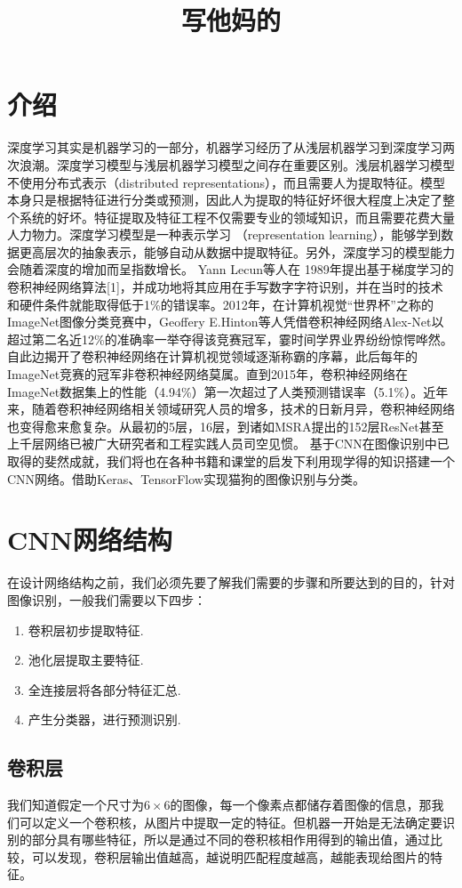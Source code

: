 \documentclass[lang=cn,11pt]{elegantpaper}
\title{写他妈的}
\date{}
\begin{document}
\newpage
\Large
\tableofcontents
\thispagestyle{empty}
\newpage
\normalsize
{}



\section{介绍}
深度学习其实是机器学习的一部分，机器学习经历了从浅层机器学习到深度学习两次浪潮。深度学习模型与浅层机器学习模型之间存在重要区别。浅层机器学习模型不使用分布式表示（distributed representations），而且需要人为提取特征。模型本身只是根据特征进行分类或预测，因此人为提取的特征好坏很大程度上决定了整个系统的好坏。特征提取及特征工程不仅需要专业的领域知识，而且需要花费大量人力物力。深度学习模型是一种表示学习 （representation learning），能够学到数据更高层次的抽象表示，能够自动从数据中提取特征。另外，深度学习的模型能力会随着深度的增加而呈指数增长。
Yann Lecun等人在 1989年提出基于梯度学习的卷积神经网络算法[1]，并成功地将其应用在手写数字字符识别，并在当时的技术和硬件条件就能取得低于1\%的错误率。2012年，在计算机视觉“世界杯”之称的ImageNet图像分类竞赛中，Geoffery E.Hinton等人凭借卷积神经网络Alex-Net以超过第二名近12\%的准确率一举夺得该竞赛冠军，霎时间学界业界纷纷惊愕哗然。自此边揭开了卷积神经网络在计算机视觉领域逐渐称霸的序幕，此后每年的ImageNet竞赛的冠军非卷积神经网络莫属。直到2015年，卷积神经网络在ImageNet数据集上的性能（4.94\%）第一次超过了人类预测错误率（5.1\%）。近年来，随着卷积神经网络相关领域研究人员的增多，技术的日新月异，卷积神经网络也变得愈来愈复杂。从最初的5层，16层，到诸如MSRA提出的152层ResNet甚至上千层网络已被广大研究者和工程实践人员司空见惯。
基于CNN在图像识别中已取得的斐然成就，我们将也在各种书籍和课堂的启发下利用现学得的知识搭建一个CNN网络。借助Keras、TensorFlow实现猫狗的图像识别与分类。


\section{CNN网络结构}
在设计网络结构之前，我们必须先要了解我们需要的步骤和所要达到的目的，针对图像识别，一般我们需要以下四步：

\begin{enumerate}
	\item 卷积层初步提取特征.
	\item 池化层提取主要特征.
	\item 全连接层将各部分特征汇总.
	\item 产生分类器，进行预测识别.
\end{enumerate}

\subsection{卷积层}
我们知道假定一个尺寸为$6\times 6$的图像，每一个像素点都储存着图像的信息，那我们可以定义一个卷积核，从图片中提取一定的特征。但机器一开始是无法确定要识别的部分具有哪些特征，所以是通过不同的卷积核相作用得到的输出值，通过比较，可以发现，卷积层输出值越高，越说明匹配程度越高，越能表现给图片的特征。
\end{document}
